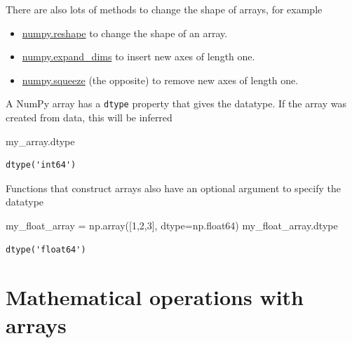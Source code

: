 \documentclass[
  letterpaper,
  DIV=11,
  numbers=noendperiod]{scrreprt}
\newenvironment{Shaded}{\begin{snugshade}}{\end{snugshade}}
\newcommand{\DecValTok}[1]{\textcolor[rgb]{0.68,0.00,0.00}{#1}}
\newcommand{\NormalTok}[1]{\textcolor[rgb]{0.00,0.23,0.31}{#1}}
\newcommand{\OperatorTok}[1]{\textcolor[rgb]{0.37,0.37,0.37}{#1}}
\theoremstyle{definition}
\theoremstyle{remark}
\begin{document}
There are also lots of methods to change the shape of arrays, for
example

\begin{itemize}
\item
  \href{https://numpy.org/doc/stable/reference/generated/numpy.reshape.html\#numpy-reshape}{numpy.reshape}
  to change the shape of an array.
\item
  \href{https://numpy.org/doc/stable/reference/generated/numpy.expand_dims.html}{numpy.expand\_dims}
  to insert new axes of length one.
\item
  \href{https://numpy.org/doc/stable/reference/generated/numpy.squeeze.html\#numpy.squeeze}{numpy.squeeze}
  (the opposite) to remove new axes of length one.
\end{itemize}

A NumPy array has a \texttt{dtype} property that gives the datatype. If
the array was created from data, this will be inferred

\begin{Shaded}
\begin{Highlighting}[]
\NormalTok{my\_array.dtype}
\end{Highlighting}
\end{Shaded}

\begin{verbatim}
dtype('int64')
\end{verbatim}

Functions that construct arrays also have an optional argument to
specify the datatype

\begin{Shaded}
\begin{Highlighting}[]
\NormalTok{my\_float\_array }\OperatorTok{=}\NormalTok{ np.array([}\DecValTok{1}\NormalTok{,}\DecValTok{2}\NormalTok{,}\DecValTok{3}\NormalTok{], dtype}\OperatorTok{=}\NormalTok{np.float64)}
\NormalTok{my\_float\_array.dtype}
\end{Highlighting}
\end{Shaded}

\begin{verbatim}
dtype('float64')
\end{verbatim}

\hypertarget{mathematical-operations-with-arrays}{%
\section{Mathematical operations with
arrays}\label{mathematical-operations-with-arrays}}
\end{document}

